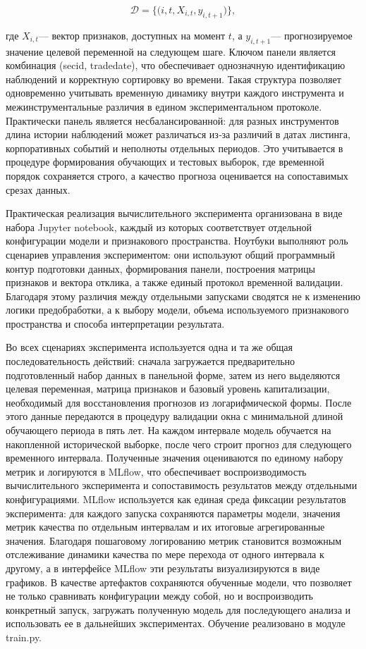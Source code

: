 \documentclass[
]{article}
\begin{document}
\[\mathcal{D = \{(}i,t,X_{i,t},y_{i,t + 1})\},
\]

где \(X_{i,t}\)--- вектор признаков, доступных на момент \(t\), а \(y_{i,t + 1}\)--- прогнозируемое значение целевой переменной на следующем шаге. Ключом панели является комбинация (secid, tradedate), что обеспечивает однозначную идентификацию наблюдений и корректную сортировку во времени. Такая структура позволяет одновременно учитывать временную динамику внутри каждого инструмента и межинструментальные различия в едином экспериментальном протоколе. Практически панель является несбалансированной: для разных инструментов длина истории наблюдений может различаться из‑за различий в датах листинга, корпоративных событий и неполноты отдельных периодов. Это учитывается в процедуре формирования обучающих и тестовых выборок, где временной порядок сохраняется строго, а качество прогноза оценивается на сопоставимых срезах данных.

Практическая реализация вычислительного эксперимента организована в виде набора Jupyter notebook, каждый из которых соответствует отдельной конфигурации модели и признакового пространства. Ноутбуки выполняют роль сценариев управления экспериментом: они используют общий программный контур подготовки данных, формирования панели, построения матрицы признаков и вектора отклика, а также единый протокол временной валидации. Благодаря этому различия между отдельными запусками сводятся не к изменению логики предобработки, а к выбору модели, объема используемого признакового пространства и способа интерпретации результата.

Во всех сценариях эксперимента используется одна и та же общая последовательность действий: сначала загружается предварительно подготовленный набор данных в панельной форме, затем из него выделяются целевая переменная, матрица признаков и базовый уровень капитализации, необходимый для восстановления прогнозов из логарифмической формы. После этого данные передаются в процедуру валидации окна с минимальной длиной обучающего периода в пять лет. На каждом интервале модель обучается на накопленной исторической выборке, после чего строит прогноз для следующего временного интервала. Полученные значения оцениваются по единому набору метрик и логируются в MLflow, что обеспечивает воспроизводимость вычислительного эксперимента и сопоставимость результатов между отдельными конфигурациями. MLflow используется как единая среда фиксации результатов эксперимента: для каждого запуска сохраняются параметры модели, значения метрик качества по отдельным интервалам и их итоговые агрегированные значения. Благодаря пошаговому логированию метрик становится возможным отслеживание динамики качества по мере перехода от одного интервала к другому, а в интерфейсе MLflow эти результаты визуализируются в виде графиков. В качестве артефактов сохраняются обученные модели, что позволяет не только сравнивать конфигурации между собой, но и воспроизводить конкретный запуск, загружать полученную модель для последующего анализа и использовать ее в дальнейших экспериментах. Обучение реализовано в модуле train.py.
\end{document}
